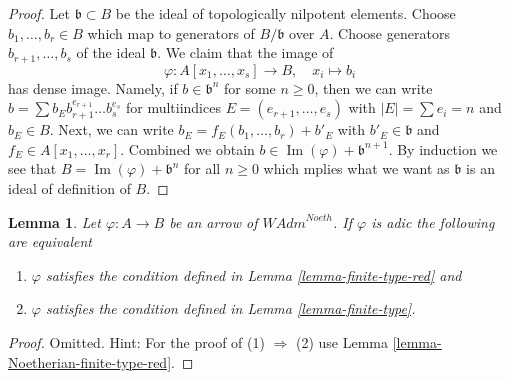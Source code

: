 \documentclass{stacks-project}
\theoremstyle{plain}
\newtheorem{lemma}[subsection]{Lemma}
\theoremstyle{definition}
\theoremstyle{remark}
\numberwithin{equation}{subsection}
\def\Im{\mathop{\mathrm{Im}}}
\begin{document}
\begin{proof}
Let $\mathfrak b \subset B$ be the
ideal of topologically nilpotent elements. Choose $b_1, \ldots, b_r \in B$
which map to generators of $B/\mathfrak b$ over $A$.
Choose generators $b_{r + 1}, \ldots, b_s$ of the ideal
$\mathfrak b$. We claim that the image of
$$
\varphi : A[x_1, \ldots, x_s] \longrightarrow B, \quad
x_i \longmapsto b_i
$$
has dense image. Namely, if $b \in \mathfrak b^n$ for some $n \geq 0$,
then we can write
$b = \sum b_E b_{r + 1}^{e_{r + 1}} \ldots b_s^{e_s}$ for multiindices
$E = (e_{r + 1}, \ldots, e_s)$ with $|E| = \sum e_i = n$ and $b_E \in B$.
Next, we can write $b_E = f_E(b_1, \ldots, b_r) + b'_E$
with $b'_E \in \mathfrak b$ and $f_E \in A[x_1, \ldots, x_r]$.
Combined we obtain $b \in \Im(\varphi) + \mathfrak b^{n + 1}$.
By induction we see that $B = \Im(\varphi) + \mathfrak b^n$ for all
$n \geq 0$ which mplies what we want as $\mathfrak b$ is an ideal
of definition of $B$.
\end{proof}

\begin{lemma}
\label{lemma-Noetherian-adic-finite-type-red}
Let $\varphi : A \to B$ be an arrow of $\textit{WAdm}^{Noeth}$.
If $\varphi$ is adic the following are equivalent
\begin{enumerate}
\item $\varphi$ satisfies the condition defined in
Lemma \ref{lemma-finite-type-red} and
\item $\varphi$ satisfies the condition defined in
Lemma \ref{lemma-finite-type}.
\end{enumerate}
\end{lemma}

\begin{proof}
Omitted. Hint: For the proof of (1) $\Rightarrow$ (2) use
Lemma \ref{lemma-Noetherian-finite-type-red}.
\end{proof}
\end{document}

